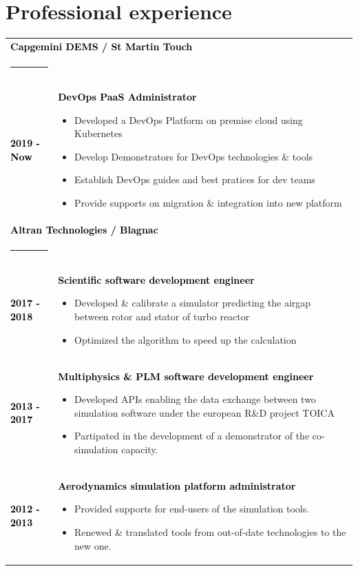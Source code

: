 \documentclass[10pt,A4]{article}
\begin{document}
\begin{minipage}[c]{0.7\textwidth}
\section*{\hspace{0.5cm}Professional experience}
%
\begin{tabular}{p{2cm}p{11cm}}
\multicolumn{2}{l}{\textcolor{black}{\bf Capgemini DEMS / St Martin Touch}}\\
\noindent\textcolor{blue}{\rule{\textwidth}{.8mm}}\\
%
\textcolor{black}{\bf 2019 - Now} & \textcolor{black}{\bf DevOps PaaS Administrator}
\begin{itemize}
  \item \small Developed a DevOps Platform on premise cloud using Kubernetes
  \item \small Develop Demonstrators for DevOps technologies \& tools   
  \item \small Establish DevOps guides and best pratices for dev teams
  \item \small Provide supports on migration \& integration into new platform
\end{itemize}\\
%
\multicolumn{2}{l}{\textcolor{black}{\bf Altran Technologies / Blagnac}}\\
\noindent\textcolor{blue}{\rule{\textwidth}{.8mm}}\\
%
\textcolor{black}{\bf 2017 - 2018} & \textcolor{black}{\bf Scientific software development engineer}
\begin{itemize}
  \item \small Developed \& calibrate a simulator predicting the airgap between rotor and stator of turbo reactor
  \item \small Optimized the algorithm to speed up the calculation
\end{itemize}\\
%
\textcolor{black}{\bf 2013 - 2017} & \textcolor{black}{\bf Multiphysics \& PLM software development engineer}
\begin{itemize}
  \item \small Developed APIs enabling the data exchange between two simulation software under the european R\&D project TOICA
  \item \small Partipated in the development of a demonstrator of the co-simulation capacity.
\end{itemize}\\
%
\textcolor{black}{\bf 2012 - 2013} & \textcolor{black}{\bf Aerodynamics simulation platform administrator}
\begin{itemize}
  \item \small Provided supports for end-users of the simulation tools.
  \item \small Renewed \& translated tools from out-of-date technologies to the new one.
\end{itemize}
%
\end{tabular}
%
\vspace*{-8mm}

\end{minipage}
\end{document}
